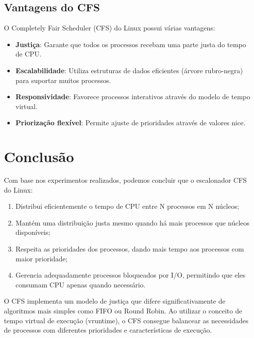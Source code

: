 \documentclass{article}
\begin{document}
\subsection{Vantagens do CFS}

O Completely Fair Scheduler (CFS) do Linux possui várias vantagens:

\begin{itemize}
    \item \textbf{Justiça}: Garante que todos os processos recebam uma parte justa do tempo de CPU.
    \item \textbf{Escalabilidade}: Utiliza estruturas de dados eficientes (árvore rubro-negra) para suportar muitos processos.
    \item \textbf{Responsividade}: Favorece processos interativos através do modelo de tempo virtual.
    \item \textbf{Priorização flexível}: Permite ajuste de prioridades através de valores nice.
\end{itemize}

\section{Conclusão}

Com base nos experimentos realizados, podemos concluir que o escalonador CFS do Linux:

\begin{enumerate}
    \item Distribui eficientemente o tempo de CPU entre N processos em N núcleos;
    \item Mantém uma distribuição justa mesmo quando há mais processos que núcleos disponíveis;
    \item Respeita as prioridades dos processos, dando mais tempo aos processos com maior prioridade;
    \item Gerencia adequadamente processos bloqueados por I/O, permitindo que eles consumam CPU apenas quando necessário.
\end{enumerate}

O CFS implementa um modelo de justiça que difere significativamente de algoritmos mais simples como FIFO ou Round Robin.
Ao utilizar o conceito de tempo virtual de execução (vruntime), o CFS consegue balancear as necessidades de processos 
com diferentes prioridades e características de execução.
\end{document}
